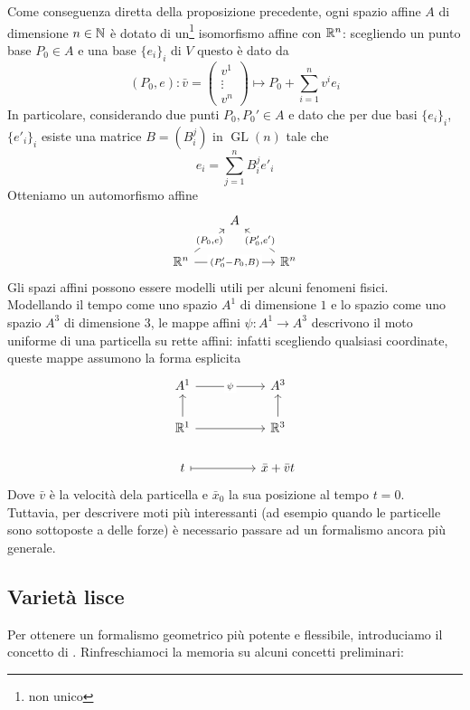 \documentclass[openany]{book}
\newcommand\GL{\operatorname{GL}}
\begin{document}
Come conseguenza diretta della proposizione precedente, ogni spazio affine $A$ di dimensione $n\in \mathbb{N}$ è dotato di un\footnote{non unico} isomorfismo affine con $\mathbb{R}^n$: scegliendo un punto base $P_0 \in A$ e una base $\{e_i\}_i$ di $V$ questo è dato da
\[ (P_0,e): \bar{v} = \begin{pmatrix} v^1\\\vdots\\v^n \end{pmatrix}\mapsto P_0 + \sum_{i=1}^n v^ie_i\]
In particolare, considerando due punti $P_0,P_0' \in A$ e dato che per due basi $\{e_i\}_i$, $\{e'_i\}_i$ esiste una matrice $B = (B_i^j)$ in $\GL(n)$ tale che 
\[ e_i = \sum_{j = 1}^n B^j_i e'_i \]
Otteniamo un automorfismo affine 
\[\begin{tikzcd}
	& A & \\
	{\R^n} && {\R^n}
	\arrow["{(P_0,e)}"{description}, from=2-1, to=1-2]
	\arrow["{(P_0'-P_0, B)}"{description}, from=2-1, to=2-3]
	\arrow["{(P'_0,e')}"{description}, from=2-3, to=1-2]
\end{tikzcd}\]
Gli spazi affini possono essere modelli utili per alcuni fenomeni fisici.\\
Modellando il tempo come uno spazio $A^1$ di dimensione $1$ e lo spazio come uno spazio $A^3$ di dimensione $3$, le mappe affini $\psi: A^1\to A^3$ descrivono il moto uniforme di una particella su rette affini: infatti scegliendo qualsiasi coordinate, queste mappe assumono la forma esplicita
\[\begin{tikzcd}
	{A^1} && {A^3} \\
	{\R^1} && {\R^3} \\
	t && {\bar{x} + \bar{v}t}
	\arrow["\psi"{description}, from=1-1, to=1-3]
	\arrow[from=2-1, to=1-1]
	\arrow[from=2-1, to=2-3]
	\arrow[from=2-3, to=1-3]
	\arrow[maps to, from=3-1, to=3-3]
\end{tikzcd}\]
Dove $\bar{v}$ è la velocità dela particella e $\bar{x}_0$ la sua posizione al tempo $t=0$.\\
Tuttavia, per descrivere moti più interessanti (ad esempio quando le particelle sono sottoposte a delle forze) è necessario passare ad un formalismo ancora più generale.

\subsection{Varietà lisce}

Per ottenere un formalismo geometrico più potente e flessibile, introduciamo il concetto di . Rinfreschiamoci la memoria su alcuni concetti preliminari:
\end{document}
